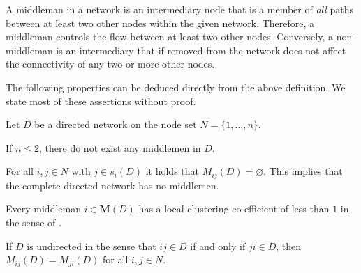 \noindent
A middleman in a network is an intermediary node that is a member of \emph{all} paths between at least two other nodes within the given network. Therefore, a middleman controls the flow between at least two other nodes. Conversely, a non-middleman is an intermediary that if removed from the network does not affect the connectivity of any two or more other nodes.

The following properties can be deduced directly from the above definition. We state most of these assertions without proof.

\begin{proposition}\label{TheoremIntermediary}
Let $D$ be a directed network on the node set $N = \{ 1, \ldots ,n \}$.
\begin{numm}
	\item If $n \leqslant 2$, there do not exist any middlemen in $D$.
	\item For all $i,j \in N$ with $j \in s_{i}(D)$ it holds that $M_{ij}(D) = \varnothing$. This implies that the complete directed network has no middlemen.
	\item Every middleman $i \in \mathbf M(D)$ has a local clustering co-efficient of less than $1$ in the sense of \citet[Sections 2.10 and 3.9]{Barabasi2016}.
	\item If $D$ is undirected in the sense that $ij \in D$ if and only if $ji \in D$, then $M_{ij}(D) = M_{ji}(D)$ for all $i,j \in N$.
\end{numm}
\end{proposition}

